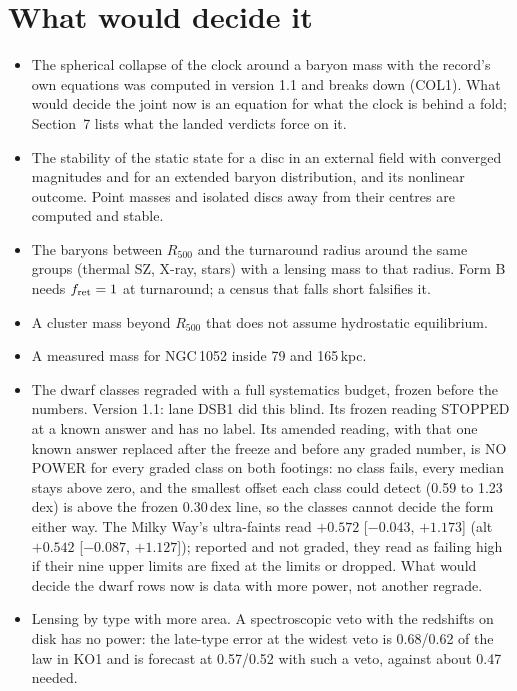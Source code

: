 \documentclass[10pt]{article}
\begin{document}
\section{What would decide it}
\begin{itemize}
\item The spherical collapse of the clock around a baryon mass with the record's own equations was computed in version 1.1 and breaks down (COL1). What would decide the joint now is an equation for what the clock is behind a fold; Section~7 lists what the landed verdicts force on it.
\item The stability of the static state for a disc in an external field with converged magnitudes and for an extended baryon distribution, and its nonlinear outcome. Point masses and isolated discs away from their centres are computed and stable.
\item The baryons between $R_{500}$ and the turnaround radius around the same groups (thermal SZ, X-ray, stars) with a lensing mass to that radius. Form B needs $f_{\rm ret}=1$ at turnaround; a census that falls short falsifies it.
\item A cluster mass beyond $R_{500}$ that does not assume hydrostatic equilibrium.
\item A measured mass for NGC\,1052 inside 79 and 165\,kpc.
\item The dwarf classes regraded with a full systematics budget, frozen before the numbers. Version 1.1: lane DSB1 did this blind. Its frozen reading STOPPED at a known answer and has no label. Its amended reading, with that one known answer replaced after the freeze and before any graded number, is NO POWER for every graded class on both footings: no class fails, every median stays above zero, and the smallest offset each class could detect (0.59 to 1.23\,dex) is above the frozen 0.30\,dex line, so the classes cannot decide the form either way. The Milky Way's ultra-faints read $+0.572$ [$-0.043$, $+1.173$] (alt $+0.542$ [$-0.087$, $+1.127$]); reported and not graded, they read as failing high if their nine upper limits are fixed at the limits or dropped. What would decide the dwarf rows now is data with more power, not another regrade.
\item Lensing by type with more area. A spectroscopic veto with the redshifts on disk has no power: the late-type error at the widest veto is 0.68/0.62 of the law in KO1 and is forecast at 0.57/0.52 with such a veto, against about 0.47 needed.

\end{itemize}
\end{document}
